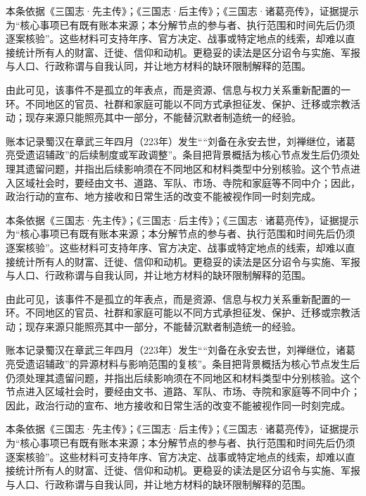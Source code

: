 本条依据《三国志·先主传》；《三国志·后主传》；《三国志·诸葛亮传》，证据提示为“核心事项已有既有账本来源；本分解节点的参与者、执行范围和时间先后仍须逐案核验”。这些材料可支持年序、官方决定、战事或特定地点的线索，却难以直接统计所有人的财富、迁徙、信仰和动机。更稳妥的读法是区分诏令与实施、军报与人口、行政称谓与自我认同，并让地方材料的缺环限制解释的范围。

由此可见，该事件不是孤立的年表点，而是资源、信息与权力关系重新配置的一环。不同地区的官员、社群和家庭可能以不同方式承担征发、保护、迁移或宗教活动；现存来源只能照亮其中一部分，不能替沉默者制造统一的经验。

账本记录蜀汉在章武三年四月（223年）发生““刘备在永安去世，刘禅继位，诸葛亮受遗诏辅政”的后续制度或军政调整”。条目把背景概括为核心节点发生后仍须处理其遗留问题，并指出后续影响须在不同地区和材料类型中分别核验。这个节点进入区域社会时，要经由文书、道路、军队、市场、寺院和家庭等不同中介；因此，政治行动的宣布、地方接收和日常生活的改变不能被视作同一时刻完成。

本条依据《三国志·先主传》；《三国志·后主传》；《三国志·诸葛亮传》，证据提示为“核心事项已有既有账本来源；本分解节点的参与者、执行范围和时间先后仍须逐案核验”。这些材料可支持年序、官方决定、战事或特定地点的线索，却难以直接统计所有人的财富、迁徙、信仰和动机。更稳妥的读法是区分诏令与实施、军报与人口、行政称谓与自我认同，并让地方材料的缺环限制解释的范围。

由此可见，该事件不是孤立的年表点，而是资源、信息与权力关系重新配置的一环。不同地区的官员、社群和家庭可能以不同方式承担征发、保护、迁移或宗教活动；现存来源只能照亮其中一部分，不能替沉默者制造统一的经验。

账本记录蜀汉在章武三年四月（223年）发生““刘备在永安去世，刘禅继位，诸葛亮受遗诏辅政”的异源材料与影响范围的复核”。条目把背景概括为核心节点发生后仍须处理其遗留问题，并指出后续影响须在不同地区和材料类型中分别核验。这个节点进入区域社会时，要经由文书、道路、军队、市场、寺院和家庭等不同中介；因此，政治行动的宣布、地方接收和日常生活的改变不能被视作同一时刻完成。

本条依据《三国志·先主传》；《三国志·后主传》；《三国志·诸葛亮传》，证据提示为“核心事项已有既有账本来源；本分解节点的参与者、执行范围和时间先后仍须逐案核验”。这些材料可支持年序、官方决定、战事或特定地点的线索，却难以直接统计所有人的财富、迁徙、信仰和动机。更稳妥的读法是区分诏令与实施、军报与人口、行政称谓与自我认同，并让地方材料的缺环限制解释的范围。

